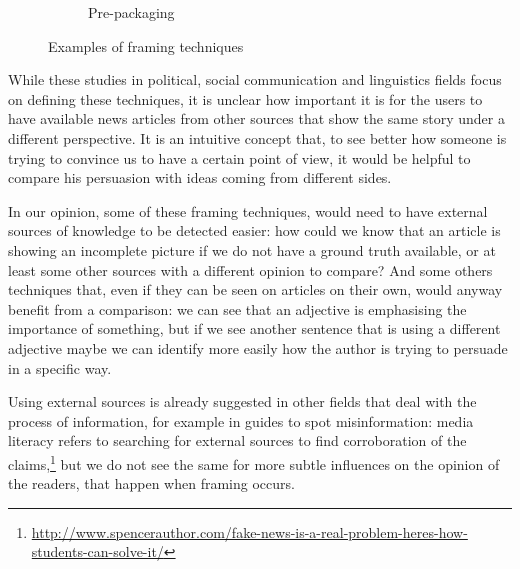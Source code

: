\begin{figure}[!htb]
\begin{subfigure}{.5\textwidth}
  \caption{Pre-packaging}
  \label{fig:sfig2}
\end{subfigure}
\caption{Examples of framing techniques}
\label{fig:fig}
\end{figure}

While these studies in political, social communication and linguistics fields focus on defining these techniques, it is unclear how important it is for the users to have available news articles from other sources that show the same story under a different perspective.
It is an intuitive concept that, to see better how someone is trying to convince us to have a certain point of view, it would be helpful to compare his persuasion with ideas coming from different sides.

In our opinion, some of these framing techniques, would need to have external sources of knowledge to be detected easier: how could we know that an article is showing an incomplete picture if we do not have a ground truth available, or at least some other sources with a different opinion to compare?
And some others techniques that, even if they can be seen on articles on their own, would anyway benefit from a comparison: we can see that an adjective is emphasising the importance of something, but if we see another sentence that is using a different adjective maybe we can identify more easily how the author is trying to persuade in a specific way.

Using external sources is already suggested in other fields that deal with the process of information, for example in guides to spot misinformation: media literacy refers to searching for external sources to find corroboration of the claims,\footnote{\url{http://www.spencerauthor.com/fake-news-is-a-real-problem-heres-how-students-can-solve-it/}} but we do not see the same for more subtle influences on the opinion of the readers, that happen when framing occurs.


